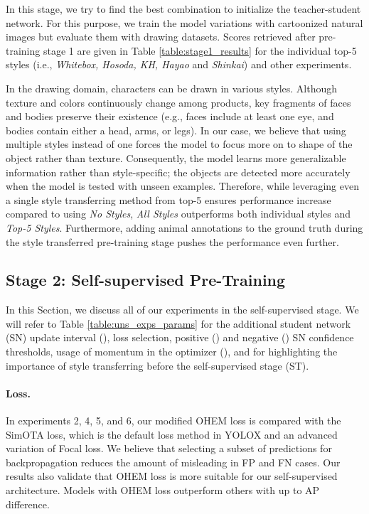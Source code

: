 \documentclass{article}
\begin{document}
In this stage, we try to find the best combination to initialize the teacher-student network. For this purpose, we train the model variations with cartoonized natural images but evaluate them with drawing datasets. Scores retrieved after pre-training stage 1 are given in Table \ref{table:stage1_results} for the individual top-5 styles (i.e., \textit{Whitebox, Hosoda, KH, Hayao} and \textit{Shinkai}) and other experiments.


In the drawing domain, characters can be drawn in various styles. Although texture and colors continuously change among products, key fragments of faces and bodies preserve their existence (e.g., faces include at least one eye, and bodies contain either a head, arms, or legs). In our case, we believe that using multiple styles instead of one forces the model to focus more on to shape of the object rather than texture. Consequently, the model learns more generalizable information rather than style-specific; the objects are detected more accurately when the model is tested with unseen examples. Therefore, while leveraging even a single style transferring method from top-5 ensures performance increase compared to using \textit{No Styles}, \textit{All Styles} outperforms both individual styles and \textit{Top-5 Styles}. Furthermore, adding animal annotations to the ground truth during the style transferred pre-training stage pushes the performance even further.

\subsection{Stage 2: Self-supervised Pre-Training}
\label{res:selfsup_train}

In this Section, we discuss all of our experiments in the self-supervised stage. We will refer to Table \ref{table:uns_exps_params} for the additional student network (SN) update interval (), loss selection, positive () and negative () SN confidence thresholds, usage of momentum in the optimizer (), and for highlighting the importance of style transferring before the self-supervised stage (ST). \\

\paragraph{Loss.}{In experiments 2, 4, 5, and 6, our modified OHEM loss is compared with the SimOTA loss, which is the default loss method in YOLOX and an advanced variation of Focal loss. We believe that selecting a subset of predictions for backpropagation reduces the amount of misleading in FP and FN cases. Our results also validate that OHEM loss is more suitable for our self-supervised architecture. Models with OHEM loss outperform others with up to  AP difference.}
\end{document}
